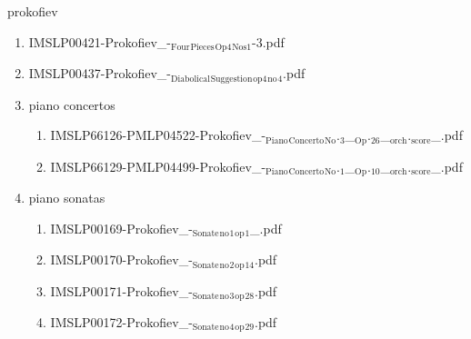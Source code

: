 \documentclass[11pt]{article}
\begin{document}
\item prokofiev
\label{sec-1-1-1-1-44-51}
\begin{enumerate}
\item IMSLP00421-Prokofiev\_-$_{\text{Four}}$$_{\text{Pieces}}$$_{\text{Op4}}$$_{\text{Nos1}}$-3.pdf
\label{sec-1-1-1-1-44-51-1}

\item IMSLP00437-Prokofiev\_-$_{\text{Diabolical}}$$_{\text{Suggestion}}$$_{\text{op4}}$$_{\text{no}}$$_{\text{4}}$.pdf
\label{sec-1-1-1-1-44-51-2}

\item piano concertos
\label{sec-1-1-1-1-44-51-3}
\begin{enumerate}
\item IMSLP66126-PMLP04522-Prokofiev\_-$_{\text{Piano}}$$_{\text{Concerto}}$$_{\text{No}}$.$_{\text{3}}$\_$_{\text{Op}}$.$_{\text{26}}$\_$_{\text{orch}}$.$_{\text{score}}$\_.pdf
\label{sec-1-1-1-1-44-51-3-1}

\item IMSLP66129-PMLP04499-Prokofiev\_-$_{\text{Piano}}$$_{\text{Concerto}}$$_{\text{No}}$.$_{\text{1}}$\_$_{\text{Op}}$.$_{\text{10}}$\_$_{\text{orch}}$.$_{\text{score}}$\_.pdf
\label{sec-1-1-1-1-44-51-3-2}
\end{enumerate}

\item piano sonatas
\label{sec-1-1-1-1-44-51-4}
\begin{enumerate}
\item IMSLP00169-Prokofiev\_-$_{\text{Sonate}}$$_{\text{no}}$$_{\text{1}}$$_{\text{op}}$$_{\text{1}}$\_.pdf
\label{sec-1-1-1-1-44-51-4-1}

\item IMSLP00170-Prokofiev\_-$_{\text{Sonate}}$$_{\text{no}}$$_{\text{2}}$$_{\text{op}}$$_{\text{14}}$.pdf
\label{sec-1-1-1-1-44-51-4-2}

\item IMSLP00171-Prokofiev\_-$_{\text{Sonate}}$$_{\text{no}}$$_{\text{3}}$$_{\text{op}}$$_{\text{28}}$.pdf
\label{sec-1-1-1-1-44-51-4-3}

\item IMSLP00172-Prokofiev\_-$_{\text{Sonate}}$$_{\text{no}}$$_{\text{4}}$$_{\text{op}}$$_{\text{29}}$.pdf
\label{sec-1-1-1-1-44-51-4-4}
\end{enumerate}
\end{enumerate}
\end{document}
